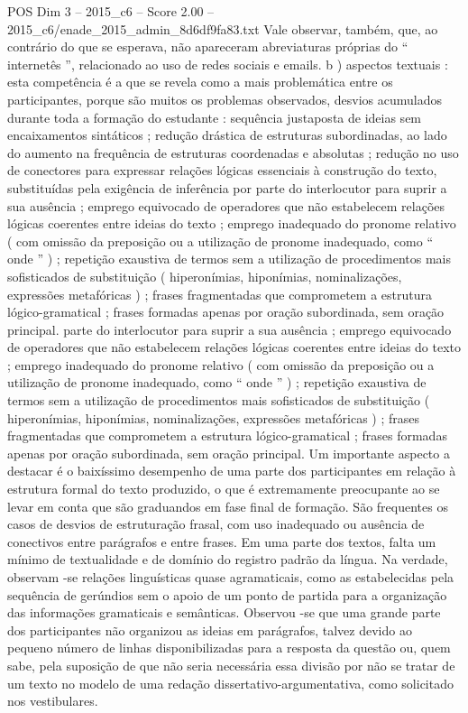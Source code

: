 \begin{textsample}{POS Dim 3 – 2015\_c6 – Score 2.00 – 2015\_c6/enade\_2015\_admin\_8d6df9fa83.txt}
Vale observar, também, que, ao contrário do que se esperava, não apareceram abreviaturas próprias do “ internetês ”, relacionado ao uso de redes sociais e emails. b ) aspectos textuais : esta competência é a que se revela como a mais problemática entre os participantes, porque são muitos os problemas observados, desvios acumulados durante toda a formação do estudante : sequência justaposta de ideias sem encaixamentos sintáticos ; redução drástica de estruturas subordinadas, ao lado do aumento na frequência de estruturas coordenadas e absolutas ; redução no uso de conectores para expressar relações lógicas essenciais à construção do texto, substituídas pela exigência de inferência por parte do interlocutor para suprir a sua ausência ; emprego equivocado de operadores que não estabelecem relações lógicas coerentes entre ideias do texto ; emprego inadequado do pronome relativo ( com omissão da preposição ou a utilização de pronome inadequado, como “ onde ” ) ; repetição exaustiva de termos sem a utilização de procedimentos mais sofisticados de substituição ( hiperonímias, hiponímias, nominalizações, expressões metafóricas ) ; frases fragmentadas que comprometem a estrutura lógico-gramatical ; frases formadas apenas por oração subordinada, sem oração principal. parte do interlocutor para suprir a sua ausência ; emprego equivocado de operadores que não estabelecem relações lógicas coerentes entre ideias do texto ; emprego inadequado do pronome relativo ( com omissão da preposição ou a utilização de pronome inadequado, como “ onde ” ) ; repetição exaustiva de termos sem a utilização de procedimentos mais sofisticados de substituição ( hiperonímias, hiponímias, nominalizações, expressões metafóricas ) ; frases fragmentadas que comprometem a estrutura lógico-gramatical ; frases formadas apenas por oração subordinada, sem oração principal.
Um importante aspecto a destacar é o baixíssimo desempenho de uma parte dos participantes em relação à estrutura formal do texto produzido, o que é extremamente preocupante ao se levar em conta que são graduandos em fase final de formação.
São frequentes os casos de desvios de estruturação frasal, com uso inadequado ou ausência de conectivos entre parágrafos e entre frases.
Em uma parte dos textos, falta um mínimo de textualidade e de domínio do registro padrão da língua.
Na verdade, observam -se relações linguísticas quase agramaticais, como as estabelecidas pela sequência de gerúndios sem o apoio de um ponto de partida para a organização das informações gramaticais e semânticas.
Observou -se que uma grande parte dos participantes não organizou as ideias em parágrafos, talvez devido ao pequeno número de linhas disponibilizadas para a resposta da questão ou, quem sabe, pela suposição de que não seria necessária essa divisão por não se tratar de um texto no modelo de uma redação dissertativo-argumentativa, como solicitado nos vestibulares.

\end{textsample}
